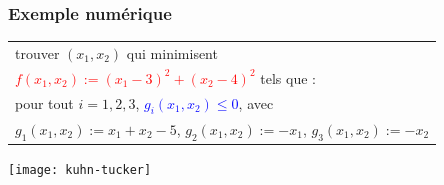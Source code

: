 \documentclass{beamer}
\begin{document}
\begin{frame}
  \frametitle{Exemple numérique}

  \begin{center}  
  \begin{tabular}{l}
    trouver $(x_1,x_2)$ qui minimisent \\
    \textcolor{red}{$f(x_1,x_2) := (x_1 - 3)^2 + (x_2 - 4)^2$} tels que : \\
    pour tout $i = 1,2,3$, \textcolor{blue}{$g_i(x_1,x_2) \leq 0$}, avec \\
    $g_1(x_1,x_2) := x_1 + x_2 - 5$, $g_2(x_1,x_2) := -x_1$, $g_3(x_1,x_2) := -x_2$ 
  \end{tabular}
  \end{center}
  
  \begin{center}  
    \texttt{[image: kuhn-tucker]}
  \end{center}
\end{frame}
\end{document}
